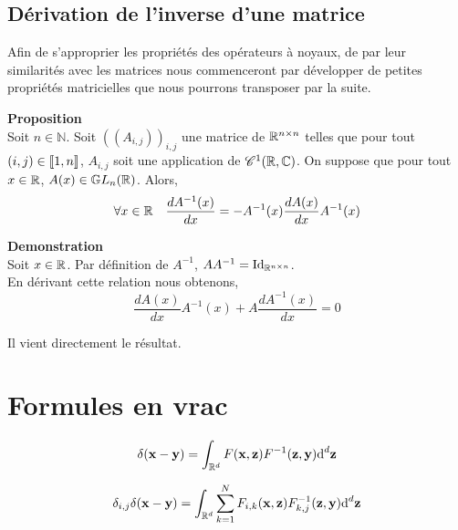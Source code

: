 \documentclass[10pt]{article}
\begin{document}
\vspace*{11pt}



\subsection{Dérivation de l'inverse d'une matrice}

Afin de s'approprier les propriétés des opérateurs à noyaux, de par leur similarités avec les matrices nous commenceront par développer de petites propriétés matricielles que nous pourrons transposer par la suite.

\vspace*{11pt}

\textbf{Proposition} \\
Soit $ n \in \mathbb{N}$. Soit $((A_{i,j}))_{i,j}$ une matrice de $\mathbb{R}^{n \times n}$ telles que pour tout $(i,j) \in  \llbracket 1,n \rrbracket $, $A_{i,j}$ soit une application de $\mathscr{C}^1(\mathbb{R},\mathbb{C}) $. On suppose que pour tout $x \in \mathbb{R}$, $A(x) \in  \mathbb{G}L_n(\mathbb{R})$. Alors, 
\begin{equation}
  \forall x \in \mathbb{R} \quad \frac{dA^{-1}(x)}{dx} = - A^{-1}(x) \frac{dA(x)}{dx}A^{-1}(x)
\end{equation} 


\textbf{Demonstration}\\
Soit $x \in \mathbb{R}$.
Par définition de $A^{-1}$, $AA^{-1} = \text{Id}_{\mathbb{R}^{n\times n}}$.\\
En dérivant cette relation nous obtenons, 
\begin{equation}
  \frac{dA(x)}{dx}A^{-1}(x) + A\frac{dA^{-1}(x)}{dx} = 0
\end{equation}

Il vient directement le résultat.



\section{Formules en vrac}

\begin{equation}
   \delta({\bf x} - {\bf y}) = \int_{\mathbb{R}^d} F({\bf x}, {\bf z}) F^{-1}({\bf z}, {\bf y}) \text{d}^d {\bf z}
\end{equation}

\begin{equation}
   \delta_{i,j} \delta({\bf x} - {\bf y}) = \int_{\mathbb{R}^d} \sum_{k=1}^{N} F_{i,k}({\bf x}, {\bf z}) F^{-1}_{k,j}({\bf z}, {\bf y}) \text{d}^d {\bf z}
\end{equation}
\end{document}
